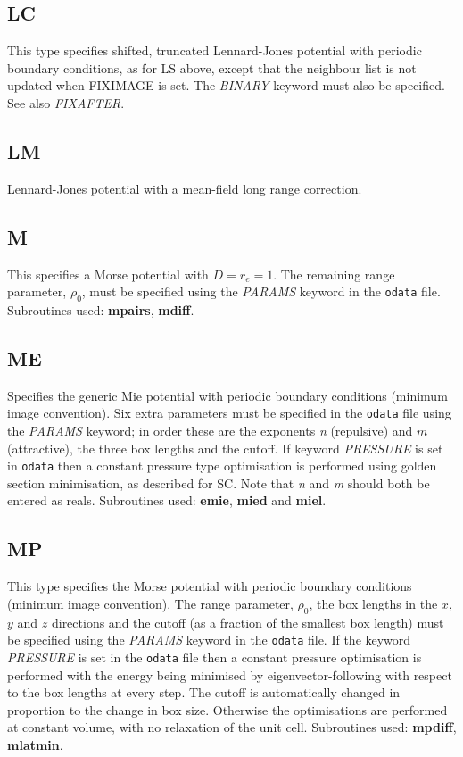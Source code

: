 \documentclass[12pt,a4paper,dvips]{article}
\begin{document}
\subsection{LC}This type specifies shifted, truncated Lennard-Jones potential with 
periodic boundary conditions, as for LS above, except that the neighbour list is not
updated when FIXIMAGE is set. The {\it BINARY\/} keyword must also be 
specified. See also {\it FIXAFTER}.

\subsection{LM}Lennard-Jones potential with a mean-field long range correction.

\subsection{M}This specifies a Morse potential with $D=r_e=1$. 
The remaining range parameter,\cite{braierbw90} $\rho_0$, must be specified using the {\it PARAMS\/} keyword
in the {\tt odata} file.
Subroutines used: {\bf mpairs}, {\bf mdiff}.

\subsection{ME}Specifies the generic Mie potential with periodic boundary conditions (minimum
image convention). Six extra parameters must be specified in the {\tt odata} file using the
{\it PARAMS\/} keyword;
in order these are the exponents {\it n\/} (repulsive) and $m$ (attractive), the three box
lengths and the cutoff. If keyword {\it PRESSURE\/} is set in {\tt odata}
then a constant pressure type optimisation is performed
using golden section minimisation, as described for SC. Note that
{\it n\/} and {\it m\/} should both be entered as reals. Subroutines used: {\bf emie}, {\bf mied}
and {\bf miel}. 

\subsection{MP}This type specifies the Morse potential with 
periodic boundary conditions (minimum image convention\cite{allent87}). 
The range parameter, $\rho_0$, the box lengths in the $x$, $y$ and $z$ 
directions and the cutoff (as a fraction of the smallest box length)
must be specified using the {\it PARAMS\/} keyword in the {\tt odata} file.
If the keyword {\it PRESSURE\/} is set in the {\tt odata} file
then a constant pressure optimisation is performed
with the energy being minimised by eigenvector-following with respect to the 
box lengths at every step. 
The cutoff is automatically changed in proportion to the change in box size.
Otherwise the optimisations are performed at constant volume, with no 
relaxation of the unit cell. 
Subroutines used: {\bf mpdiff}, {\bf mlatmin}.
\end{document}
